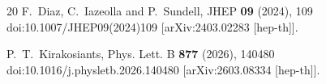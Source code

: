 \documentclass[12pt]{article}
\begin{document}
\begin{thebibliography}{20}
F.~Diaz, C.~Iazeolla and P.~Sundell,
JHEP \textbf{09} (2024), 109
doi:10.1007/JHEP09(2024)109
[arXiv:2403.02283 [hep-th]].

P.~T.~Kirakosiants,
Phys. Lett. B \textbf{877} (2026), 140480
doi:10.1016/j.physletb.2026.140480
[arXiv:2603.08334 [hep-th]].
\end{thebibliography}
\end{document}
